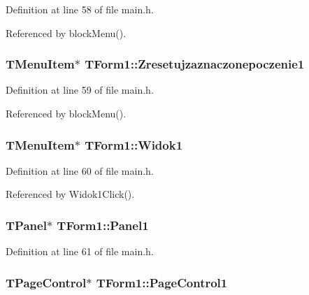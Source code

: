 Definition at line 58 of file main.h.

Referenced by blockMenu().\hypertarget{classTForm1_a87f55c562f7b38bcf5e4388a94cf09c}{
\subsubsection[Zresetujzaznaczonepoczenie1]{\setlength{\rightskip}{0pt plus 5cm}TMenuItem$\ast$ {\bf TForm1::Zresetujzaznaczonepoczenie1}}}
\label{classTForm1_a87f55c562f7b38bcf5e4388a94cf09c}




Definition at line 59 of file main.h.

Referenced by blockMenu().\hypertarget{classTForm1_d022e2ac667384e64e28f323134fe641}{
\subsubsection[Widok1]{\setlength{\rightskip}{0pt plus 5cm}TMenuItem$\ast$ {\bf TForm1::Widok1}}}
\label{classTForm1_d022e2ac667384e64e28f323134fe641}




Definition at line 60 of file main.h.

Referenced by Widok1Click().\hypertarget{classTForm1_42146ef4803abfd8ffd5d546f2465d6d}{
\subsubsection[Panel1]{\setlength{\rightskip}{0pt plus 5cm}TPanel$\ast$ {\bf TForm1::Panel1}}}
\label{classTForm1_42146ef4803abfd8ffd5d546f2465d6d}




Definition at line 61 of file main.h.\hypertarget{classTForm1_0fc87f66d019c1324bc038c5beb168c0}{
\subsubsection[PageControl1]{\setlength{\rightskip}{0pt plus 5cm}TPageControl$\ast$ {\bf TForm1::PageControl1}}}
\label{classTForm1_0fc87f66d019c1324bc038c5beb168c0}




